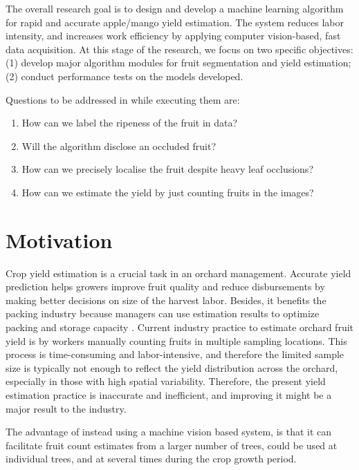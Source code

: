 \documentclass[12pt]{article}
\begin{document}
The overall research goal is to design and develop a machine learning algorithm for rapid and accurate apple/mango yield estimation. The system reduces labor intensity, and increases work efficiency by applying computer vision-based, fast data
acquisition. At this stage of the research, we focus on two specific objectives: (1) develop major algorithm modules for fruit segmentation and yield estimation; (2) conduct performance tests on the models developed.

Questions to be addressed in while executing them are:
\begin{enumerate}
  \item How can we label the ripeness of the fruit in data?
  \item Will the algorithm disclose an occluded fruit?
  \item How can we precisely localise the fruit despite heavy leaf occlusions?
  \item How can we estimate the yield by just counting fruits in the images?
\end{enumerate}


\section{Motivation}    

Crop yield estimation is a crucial task in an orchard management. Accurate yield prediction helps growers improve fruit quality and reduce disbursements by making better decisions on size of the harvest labor. Besides, it benefits the packing industry because managers can use estimation results to optimize packing and storage capacity \cite{inproceedings_wang}. Current industry practice to estimate orchard fruit yield is by workers manually counting fruits in multiple sampling locations. This process is time-consuming and labor-intensive, and therefore the limited sample size is typically not enough to reflect the yield distribution across the orchard, especially in those with high spatial variability\cite{inproceedings_wang}. Therefore, the present yield estimation practice is inaccurate and inefficient,
and improving it might be a major result to the industry.

The advantage of instead using a machine vision based system, is that it can facilitate fruit count estimates from a larger number of trees, could be used at individual trees, and at several times during the crop growth period.
\end{document}
